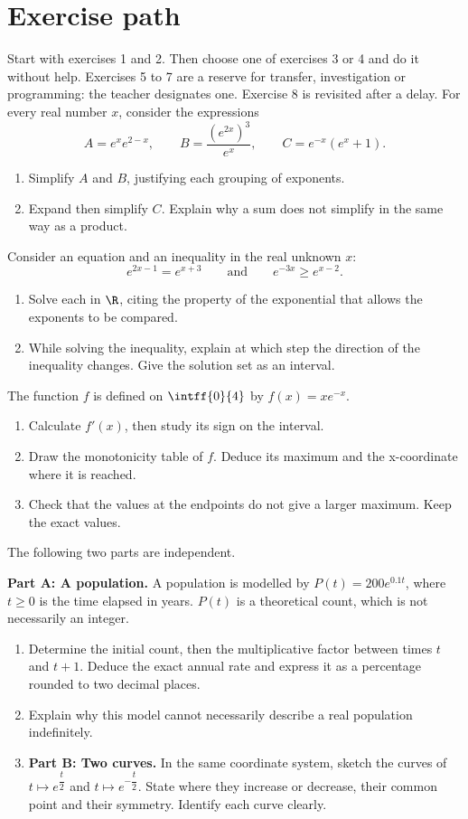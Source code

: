 \section*{Exercise path}\label{C09-PARC}
Start with exercises 1 and 2. Then choose one of exercises 3 or 4 and do it without help. Exercises 5 to 7 are a reserve for transfer, investigation or programming: the teacher designates one. Exercise 8 is revisited after a delay.
\begingroup
{}
For every real number $x$, consider the expressions\[A=e^xe^{2-x},\qquad B=\dfrac{(e^{2x})^3}{e^x},\qquad C=e^{-x}(e^x+1).\]
\begin{enumerate}[label=\arabic*.]
\item Simplify $A$ and $B$, justifying each grouping of exponents.
\item Expand then simplify $C$. Explain why a sum does not simplify in the same way as a product.
\end{enumerate}
Consider an equation and an inequality in the real unknown $x$:\[e^{2x-1}=e^{x+3}\qquad\text{and}\qquad e^{-3x}\geq e^{x-2}.\]
\begin{enumerate}[label=\arabic*.]
\item Solve each in $\R$, citing the property of the exponential that allows the exponents to be compared.
\item While solving the inequality, explain at which step the direction of the inequality changes. Give the solution set as an interval.
\end{enumerate}
The function $f$ is defined on $\intff{0}{4}$ by $f(x)=xe^{-x}$.
\begin{enumerate}[label=\arabic*.]
\item Calculate $f\prime(x)$, then study its sign on the interval.
\item Draw the monotonicity table of $f$. Deduce its maximum and the x-coordinate where it is reached.
\item Check that the values at the endpoints do not give a larger maximum. Keep the exact values.
\end{enumerate}
The following two parts are independent.\par\textbf{Part A: A population.} A population is modelled by $P(t)=200e^{\num{0,1}t}$, where $t\geq0$ is the time elapsed in years. $P(t)$ is a theoretical count, which is not necessarily an integer.
\begin{enumerate}[label=\arabic*.]
\item Determine the initial count, then the multiplicative factor between times $t$ and $t+1$. Deduce the exact annual rate and express it as a percentage rounded to two decimal places.
\item Explain why this model cannot necessarily describe a real population indefinitely.
\item \textbf{Part B: Two curves.} In the same coordinate system, sketch the curves of $t\mapsto e^{\dfrac{t}{2}}$ and $t\mapsto e^{-\dfrac{t}{2}}$. State where they increase or decrease, their common point and their symmetry. Identify each curve clearly.
\end{enumerate}
